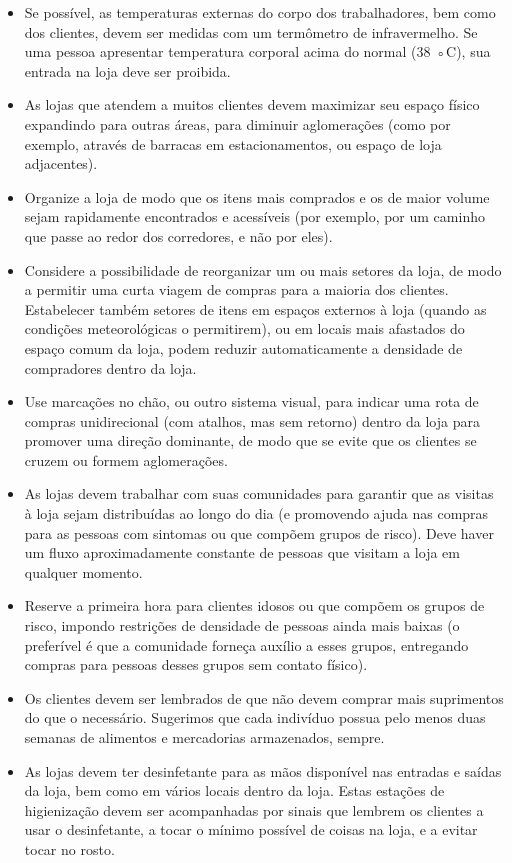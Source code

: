 \documentclass[onecolumn,journal]{IEEEtran}
\begin{document}
\begin{multicols}{2}
\begin{itemize}
\item Se possível, as temperaturas externas do corpo dos trabalhadores, bem como dos clientes, devem ser medidas com um termômetro de infravermelho. Se uma pessoa apresentar temperatura corporal acima do normal (38 ◦C), sua entrada na loja deve ser proibida.
\item As lojas que atendem a muitos clientes devem maximizar seu espaço físico expandindo para outras áreas, para diminuir aglomerações (como por exemplo, através de barracas em estacionamentos, ou espaço de loja adjacentes).
\item Organize a loja de modo que os itens mais comprados e os de maior volume sejam rapidamente encontrados e acessíveis (por exemplo, por um caminho que passe ao redor dos corredores, e não por eles).
\item Considere a possibilidade de reorganizar um ou mais setores da loja, de modo a permitir uma curta viagem de compras para a maioria dos clientes. Estabelecer também setores de itens em espaços externos à loja (quando as condições meteorológicas o permitirem), ou em locais mais afastados do espaço comum da loja, podem reduzir automaticamente a densidade de compradores dentro da loja.
\item Use marcações no chão, ou outro sistema visual, para indicar uma rota de compras unidirecional (com atalhos, mas sem retorno) dentro da loja para promover uma direção dominante, de modo que se evite que os clientes se cruzem ou formem aglomerações.
\item As lojas devem trabalhar com suas comunidades para garantir que as visitas à loja sejam distribuídas ao longo do dia (e promovendo ajuda nas compras para as pessoas com sintomas ou que compõem grupos de risco). Deve haver um fluxo aproximadamente constante de pessoas que visitam a loja em qualquer momento.
\item Reserve a primeira hora para clientes idosos ou que compõem os grupos de risco, impondo restrições de densidade de pessoas ainda mais baixas (o preferível é que a comunidade forneça auxílio a esses grupos, entregando compras para pessoas desses grupos sem contato físico).
\item Os clientes devem ser lembrados de que não devem comprar mais suprimentos do que o necessário. Sugerimos que cada indivíduo possua pelo menos duas semanas de alimentos e mercadorias armazenados, sempre.
\item As lojas devem ter desinfetante para as mãos disponível nas entradas e saídas da loja, bem como em vários locais dentro da loja. Estas estações de higienização devem ser acompanhadas por sinais que lembrem os clientes a usar o desinfetante, a tocar o mínimo possível de coisas na loja, e a evitar tocar no rosto.

\end{itemize}
\end{multicols}
\end{document}
